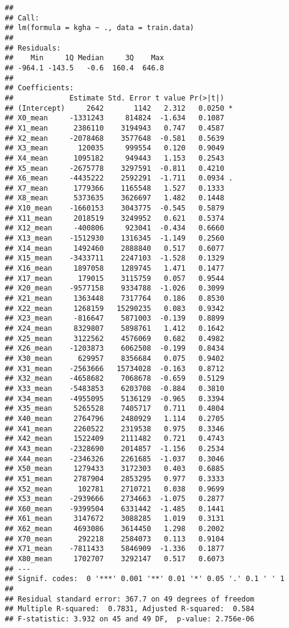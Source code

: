 \documentclass[
]{article}
\begin{document}
\begin{verbatim}
## 
## Call:
## lm(formula = kgha ~ ., data = train.data)
## 
## Residuals:
##    Min     1Q Median     3Q    Max 
## -964.1 -143.5   -0.6  160.4  646.8 
## 
## Coefficients:
##             Estimate Std. Error t value Pr(>|t|)  
## (Intercept)     2642       1142   2.312   0.0250 *
## X0_mean     -1331243     814824  -1.634   0.1087  
## X1_mean      2386110    3194943   0.747   0.4587  
## X2_mean     -2078468    3577648  -0.581   0.5639  
## X3_mean       120035     999554   0.120   0.9049  
## X4_mean      1095182     949443   1.153   0.2543  
## X5_mean     -2675778    3297591  -0.811   0.4210  
## X6_mean     -4435222    2592291  -1.711   0.0934 .
## X7_mean      1779366    1165548   1.527   0.1333  
## X8_mean      5373635    3626697   1.482   0.1448  
## X10_mean    -1660153    3043775  -0.545   0.5879  
## X11_mean     2018519    3249952   0.621   0.5374  
## X12_mean     -400806     923041  -0.434   0.6660  
## X13_mean    -1512930    1316345  -1.149   0.2560  
## X14_mean     1492460    2888840   0.517   0.6077  
## X15_mean    -3433711    2247103  -1.528   0.1329  
## X16_mean     1897058    1289745   1.471   0.1477  
## X17_mean      179015    3115759   0.057   0.9544  
## X20_mean    -9577158    9334788  -1.026   0.3099  
## X21_mean     1363448    7317764   0.186   0.8530  
## X22_mean     1268159   15290235   0.083   0.9342  
## X23_mean     -816647    5871003  -0.139   0.8899  
## X24_mean     8329807    5898761   1.412   0.1642  
## X25_mean     3122562    4576069   0.682   0.4982  
## X26_mean    -1203873    6062508  -0.199   0.8434  
## X30_mean      629957    8356684   0.075   0.9402  
## X31_mean    -2563666   15734028  -0.163   0.8712  
## X32_mean    -4658682    7068678  -0.659   0.5129  
## X33_mean    -5483853    6203708  -0.884   0.3810  
## X34_mean    -4955095    5136129  -0.965   0.3394  
## X35_mean     5265528    7405717   0.711   0.4804  
## X40_mean     2764796    2480929   1.114   0.2705  
## X41_mean     2260522    2319538   0.975   0.3346  
## X42_mean     1522409    2111482   0.721   0.4743  
## X43_mean    -2328690    2014857  -1.156   0.2534  
## X44_mean    -2346326    2261685  -1.037   0.3046  
## X50_mean     1279433    3172303   0.403   0.6885  
## X51_mean     2787904    2853295   0.977   0.3333  
## X52_mean      102781    2710721   0.038   0.9699  
## X53_mean    -2939666    2734663  -1.075   0.2877  
## X60_mean    -9399504    6331442  -1.485   0.1441  
## X61_mean     3147672    3088285   1.019   0.3131  
## X62_mean     4693086    3614450   1.298   0.2002  
## X70_mean      292218    2584073   0.113   0.9104  
## X71_mean    -7811433    5846909  -1.336   0.1877  
## X80_mean     1702707    3292147   0.517   0.6073  
## ---
## Signif. codes:  0 '***' 0.001 '**' 0.01 '*' 0.05 '.' 0.1 ' ' 1
## 
## Residual standard error: 367.7 on 49 degrees of freedom
## Multiple R-squared:  0.7831, Adjusted R-squared:  0.584 
## F-statistic: 3.932 on 45 and 49 DF,  p-value: 2.756e-06
\end{verbatim}
\end{document}
